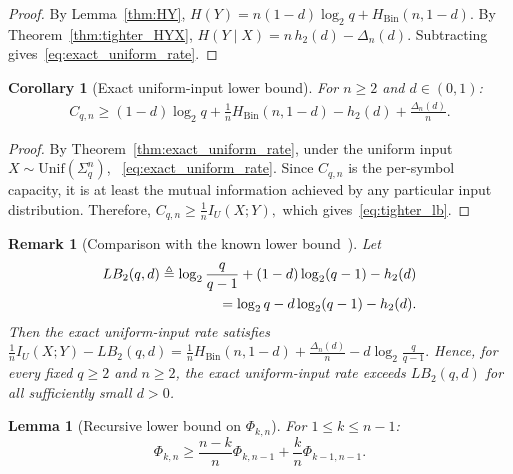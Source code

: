 \documentclass[conference]{IEEEtran}
\newtheorem{lemma}{Lemma}
\newtheorem{corollary}{Corollary}
\newtheorem{remark}{Remark}
\begin{document}
\begin{proof}
By Lemma~\ref{thm:HY},
\(
H(Y)=n(1-d)\log_2 q+H_{\mathrm{Bin}}(n,1-d).
\)
By Theorem~\ref{thm:tighter_HYX},
\(
H(Y\mid X)=n\,h_2(d)-\Delta_n(d).
\)
Subtracting gives~\eqref{eq:exact_uniform_rate}.
\end{proof}

\begin{corollary}[Exact uniform-input lower bound]
\label{cor:exact_uniform_lb}
For $n\ge 2$ and $d\in(0,1)$:
\begin{align}
  C_{q,n}\ge (1-d)\log_2 q
    + \frac{1}{n}H_{\mathrm{Bin}}(n,1-d)
    - h_2(d)
    + \frac{\Delta_n(d)}{n}.
  \label{eq:tighter_lb}
\end{align}
\end{corollary}

\begin{proof}
By Theorem~\ref{thm:exact_uniform_rate}, under the uniform input 
$X\sim\mathrm{Unif}(\Sigma_q^n)$, ~\eqref{eq:exact_uniform_rate}.
Since $C_{q,n}$ is the per-symbol capacity, it is at least the mutual
information achieved by any particular input distribution. Therefore,
\(
C_{q,n}\ge \frac{1}{n}I_U(X;Y),
\)
which gives~\eqref{eq:tighter_lb}.
\end{proof}

\begin{remark}[Comparison with the known lower bound~\cite{diggavi2001}]
\label{rem:B2_compare}
Let
\begin{align}
LB_2(q,d)\triangleq \log_2\frac{q}{q-1}+(1-d)\log_2(q-1)-h_2(d) \notag \\
        =\log_2 q-d\log_2(q-1)-h_2(d).
        \label{eq:B2}
\end{align}
Then the exact uniform-input rate satisfies
\(
\frac{1}{n}I_U  (X;Y)  -LB_2(q,d)
=\frac{1}{n}H_{\mathrm{Bin}}(n,1-d)+\frac{\Delta_n(d)}{n}
-d\log_2\frac{q}{q-1}.
\)
Hence, for every fixed $q\ge 2$ and $n\ge 2$, the exact uniform-input
rate exceeds $LB_2(q,d)$ for all sufficiently small $d>0$.
\end{remark}

\begin{lemma}[Recursive lower bound on $\Phi_{k,n}$]
\label{lem:Phi_rec}
For $1\le k\le n-1$:
\begin{equation}
  \Phi_{k,n}\ge\frac{n-k}{n}\Phi_{k,n-1}+\frac{k}{n}\Phi_{k-1,n-1}.
  \label{eq:Phi_rec}
\end{equation}
\end{lemma}
\end{document}
